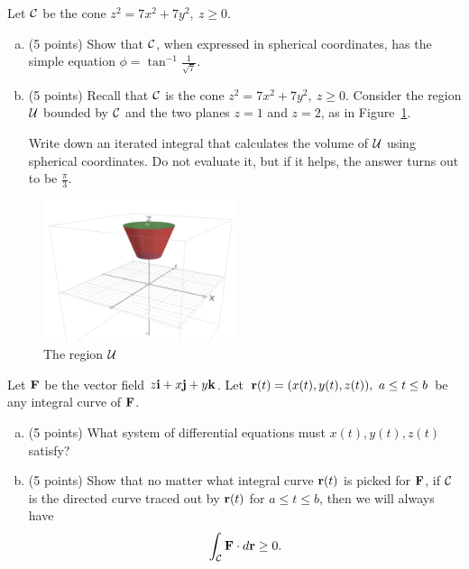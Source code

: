 \documentclass[11pt,oneside]{amsart}
\begin{document}
\newpage

\begin{problem}
  Let $\mathcal C$ be the cone $z^2=7x^2+7y^2,\ z\geq 0$.
  \begin{enumerate}[(a)]
    \item (5 points) Show that $\mathcal C$, when expressed in spherical coordinates, has the simple equation $\phi=\tan^{-1}\frac1{\sqrt7}$.
    \newpage
    \item (5 points) Recall that $\mathcal C$ is the cone $z^2=7x^2+7y^2,\ z\geq 0$. Consider the region $\mathcal U$ bounded by $\mathcal C$ and the two planes $z=1$ and $z=2$, as in Figure~\ref{fig:cone}.

    Write down an iterated integral that calculates the volume of $\mathcal U$ using spherical coordinates. Do not evaluate it, but if it helps, the answer turns out to be $\frac\pi3$.
  \end{enumerate}
  \begin{figure}[b]
    \centering
    \includegraphics[width=0.5\textwidth]{cone.png}
    \caption{The region $\mathcal U$}
    \label{fig:cone}
  \end{figure}
\end{problem}

\newpage

\begin{problem}
  Let $\mathbf F$ be the vector field $z\mathbf i+x\mathbf j+y\mathbf k$. Let $\mathbf r(t)=(x(t),y(t),z(t)),\ a\leq t\leq b$ be any integral curve of $\mathbf F$.
  \begin{enumerate}[(a)]
    \item (5 points) What system of differential equations must $x(t),y(t),z(t)$ satisfy?
    \vfil
    \item (5 points) Show that no matter what integral curve $\mathbf r(t)$ is picked for $\mathbf F$, if $\mathcal C$ is the directed curve traced out by $\mathbf r(t)$ for $a\leq t\leq b$, then we will always have
    \[\int_\mathcal C \mathbf F\cdot d\mathbf r\geq 0.\]
  \end{enumerate}
\end{problem}
\end{document}
